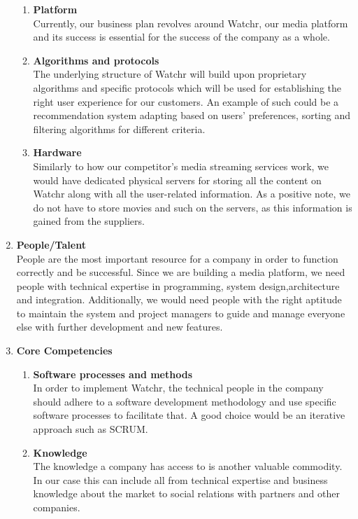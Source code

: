 \begin{enumerate}
  	\begin{enumerate}
   		\item \textbf{Platform}\\
Currently, our business plan revolves around Watchr, our media platform and its success is essential for the success of the company as a whole.
	    \item \textbf{Algorithms and protocols}\\ 
The underlying structure of Watchr will build upon proprietary algorithms and specific protocols which will be used for establishing the right user experience for our customers. An example of such could be a recommendation system adapting based on users' preferences, sorting and filtering algorithms for different criteria. 
    	\item \textbf{Hardware}\\
Similarly to how our competitor's media streaming services work, we would have dedicated physical servers for storing all the content on Watchr along with all the user-related information. As a positive note, we do not have to store movies and such on the servers, as this information is gained from the suppliers.
  	\end{enumerate}
  \item \textbf{People/Talent}\\
People are the most important resource for a company in order to function correctly and be successful. Since we are building a media platform, we need people with technical expertise in programming, system design,architecture and integration. Additionally, we would need people with the right aptitude to maintain the system and project managers to guide and manage everyone else with further development and new features.
  \item \textbf{Core Competencies}
  	\begin{enumerate}
        	\item \textbf{Software processes and methods}\\
In order to implement Watchr, the technical people in the company should adhere to a software development methodology and use specific software processes to facilitate that. A good choice would be an iterative approach such as SCRUM.
        	\item \textbf{Knowledge}\\
The knowledge a company has access to is another valuable commodity. In our case this can include all from technical expertise and business knowledge about the market to social relations with partners and other companies.

\end{enumerate}
\end{enumerate}
